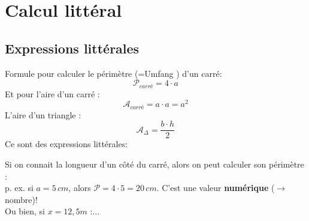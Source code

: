 \chapter{Calcul littéral}

\section{Expressions littérales}
\noindent
Formule pour calculer le périmètre (=\og Umfang \fg) d'un carré:
$$ \mathcal{P}_{carré} = 4\cdot a $$
Et pour l'aire d'un carré :
$$ \mathcal{A}_{carré} = a\cdot a = a^2 $$
L'aire d'un triangle :
$$ \mathcal{A}_{\Delta} = \frac{b \cdot h}{2} $$
Ce sont des expressions littérales:


Si on connait la longueur d'un côté du carré, alors on peut calculer son périmètre : \\
p. ex. si $a=5\, cm$, alors $\mathcal{P} = 4\cdot 5 = 20\, cm$.
C'est une valeur \textbf{numérique} ($\rightarrow$ nombre)! \\
Ou bien, si $x=12,5 m$ :...


